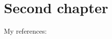 \documentclass[../main]{subfiles}
\begin{document}
\chapter{Second chapter}

My references: \cite{B}



\end{document}
